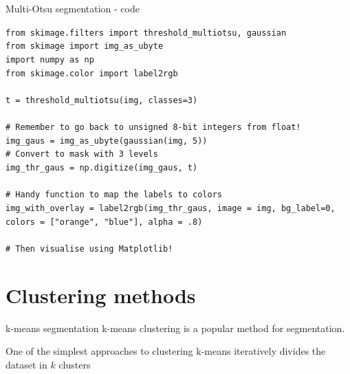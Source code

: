 \documentclass[9pt, aspectratio=169]{beamer}
\begin{document}
\begin{frame}
    {Multi-Otsu segmentation - code}
    \begin{codebox}
        \texttt{from skimage.filters import threshold\_multiotsu, gaussian\\
            from skimage import img\_as\_ubyte\\
            import numpy as np\\
            from skimage.color import label2rgb\\
            \\
            t = threshold\_multiotsu(img, classes=3)\\
            \\
            \pause
            \# Remember to go back to unsigned 8-bit integers from float!\\
            img\_gaus = img\_as\_ubyte(gaussian(img, 5))\\
            \# Convert to mask with 3 levels\\
            img\_thr\_gaus = np.digitize(img\_gaus, t)\\
            \\
            \pause
            \# Handy function to map the labels to colors\\
            img\_with\_overlay = label2rgb(img\_thr\_gaus, image = img, bg\_label=0, colors = ["orange", "blue"], alpha = .8)\\
            \\
            \# Then visualise using Matplotlib!
        }
    \end{codebox}
\end{frame}

\section{Clustering methods}

\begin{frame}
    {k-means segmentation}
    k-means clustering is a popular method for segmentation.

    One of the simplest approaches to clustering
    k-means iteratively divides the dataset in $k$ clusters
\end{frame}
\end{document}
